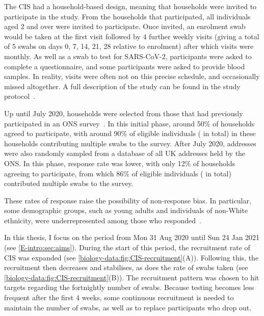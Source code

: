 \documentclass[thesis.tex]{subfiles}
\begin{document}
The CIS had a household-based design, meaning that households were invited to participate in the study.
From the households that participated, all individuals aged 2 and over were invited to participate.
Once invited, an enrolment swab would be taken at the first visit followed by 4 further weekly visits (giving a total of 5 swabs on days 0, 7, 14, 21, 28 relative to enrolment) after which visits were monthly.
As well as a swab to test for SARS-CoV-2, participants were asked to complete a questionnaire, and some participants were asked to provide blood samples.
In reality, visits were often not on this precise schedule, and occasionally missed altogether.
A full description of the study can be found in the study protocol~\autocite{cisProtocol}.

Up until July 2020, households were selected from those that had previously participated in an ONS survey~\autocite{CIStechData}.
In this initial phase, around 50\% of households agreed to participate, with around 90\% of eligible individuals ( in total) in these households contributing multiple swabs to the survey.
After July 2020, addresses were also randomly sampled from a database of all UK addresses held by the ONS.
In this phase, response rate was lower, with only 12\% of households agreeing to participate, from which 86\% of eligible individuals ( in total) contributed multiple swabs to the survey.

These rates of response raise the possibility of non-response bias.
In particular, some demographic groups, such as young adults and individuals of non-White ethnicity, were underrepresented among those who responded~\autocite{pouwelsCommunity}.

In this thesis, I focus on the period from Mon 31 Aug 2020 until Sun 24 Jan 2021 (see \cref{E-intro:sec:aims}).
During the start of this period, the recruitment rate of CIS was expanded (see \cref{biology-data:fig:CIS-recruitment}(A)).
Following this, the recruitment then decreases and stabilises, as does the rate of swabs taken (see \cref{biology-data:fig:CIS-recruitment}(B)).
The recruitment pattern was chosen to hit targets regarding the fortnightly number of swabs.
Because testing becomes less frequent after the first 4 weeks, some continuous recruitment is needed to maintain the number of swabs, as well as to replace participants who drop out.
\end{document}
